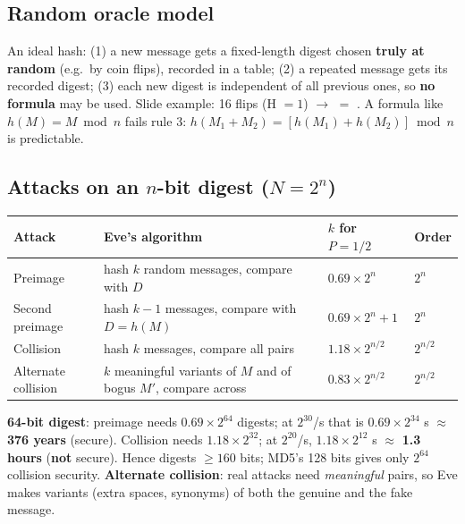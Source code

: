 \subsection{Random oracle model}
An ideal hash: (1) a new message gets a fixed-length digest chosen \textbf{truly at random} (e.g.\ by coin flips), recorded in a table; (2) a repeated message gets its recorded digest; (3) each new digest is independent of all previous ones, so \textbf{no formula} may be used. Slide example: 16 flips  (H $= 1$) $\to$  $=$ . A formula like $h(M) = M \bmod n$ fails rule 3: $h(M_1 + M_2) = [h(M_1) + h(M_2)] \bmod n$ is predictable.

\subsection{Attacks on an $n$-bit digest ($N = 2^n$)}
\begin{center}\small
\begin{tabular}{@{}llll@{}}
\toprule
Attack & Eve's algorithm & $k$ for $P = 1/2$ & Order\\
\midrule
Preimage & hash $k$ random messages, compare with $D$ & $0.69 \times 2^n$ & $2^n$\\
Second preimage & hash $k - 1$ messages, compare with $D = h(M)$ & $0.69 \times 2^n + 1$ & $2^n$\\
Collision & hash $k$ messages, compare all pairs & $1.18 \times 2^{n/2}$ & $2^{n/2}$\\
Alternate collision & $k$ meaningful variants of $M$ and of bogus $M'$, compare across & $0.83 \times 2^{n/2}$ & $2^{n/2}$\\
\bottomrule
\end{tabular}
\end{center}
\textbf{64-bit digest}: preimage needs $0.69 \times 2^{64}$ digests; at $2^{30}$/s that is $0.69 \times 2^{34}$ s $\approx$ \textbf{376 years} (secure). Collision needs $1.18 \times 2^{32}$; at $2^{20}$/s, $1.18 \times 2^{12}$ s $\approx$ \textbf{1.3 hours} (\textbf{not} secure). Hence digests $\ge 160$ bits; MD5's 128 bits gives only $2^{64}$ collision security.
\textbf{Alternate collision}: real attacks need \emph{meaningful} pairs, so Eve makes variants (extra spaces, synonyms) of both the genuine and the fake message.

